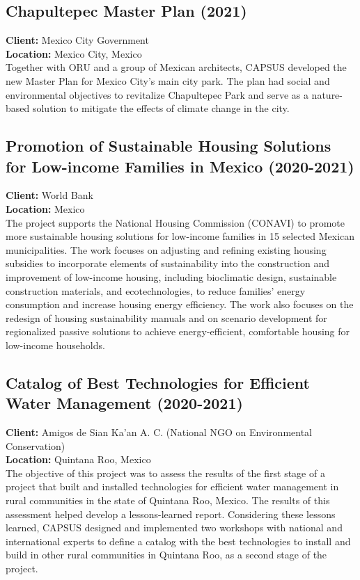 \documentclass[
	a4paper,
	12pt,
	unnumberedsections,
]{CSSullivanBusinessReport}
\begin{document}
\subsection{Chapultepec Master Plan (2021)}
\textbf{Client:}  Mexico City Government \\
\textbf{Location:}  Mexico City, Mexico  \\[0.5em]
 Together with ORU and a group of Mexican architects, CAPSUS developed the new Master Plan for Mexico City's main city park. The plan had social and environmental objectives to revitalize Chapultepec Park and serve as a nature-based solution to mitigate the effects of climate change in the city.

\subsection{Promotion of Sustainable Housing Solutions for Low-income Families in Mexico (2020-2021)}
\textbf{Client:}  World Bank \\
\textbf{Location:}  Mexico \\[0.5em]
 The project supports the National Housing Commission (CONAVI) to promote more sustainable housing solutions for low-income families in 15 selected Mexican municipalities. The work focuses on adjusting and refining existing housing subsidies to incorporate elements of sustainability into the construction and improvement of low-income housing, including bioclimatic design, sustainable construction materials, and ecotechnologies, to reduce families' energy consumption and increase housing energy efficiency.  The work also focuses on the redesign of housing sustainability manuals and on scenario development for regionalized passive solutions to achieve energy-efficient, comfortable housing for low-income households.

\subsection{Catalog of Best Technologies for Efficient Water Management (2020-2021)}
\textbf{Client:}  Amigos de Sian Ka’an A. C. (National NGO on Environmental Conservation) \\
\textbf{Location:}  Quintana Roo, Mexico  \\[0.5em]
 The objective of this project was to assess the results of the first stage of a project that built and installed technologies for efficient water management in rural communities in the state of Quintana Roo, Mexico. The results of this assessment helped develop a lessons-learned report. Considering these lessons learned, CAPSUS designed and implemented two workshops with national and international experts to define a catalog with the best technologies to install and build in other rural communities in Quintana Roo, as a second stage of the project.
\end{document}
